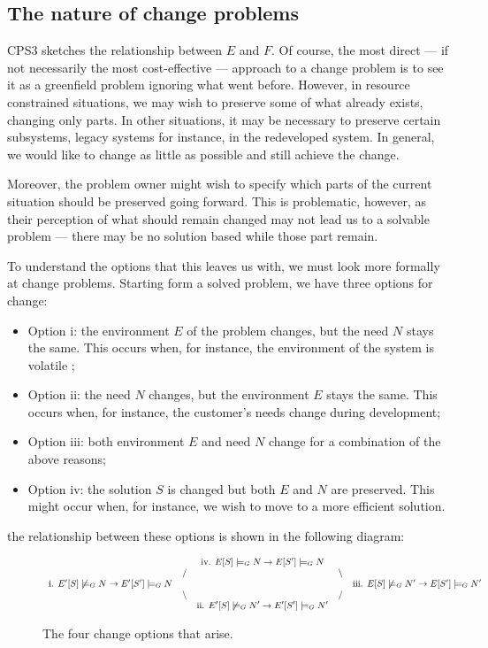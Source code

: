 \documentclass[runningheads,a4paper]{llncs}
\begin{document}
\subsection{The nature of change problems}

CPS3 sketches the relationship between $E$ and $F$. Of course, the most direct --- if not necessarily the most cost-effective --- approach to a change problem is to see it as a greenfield problem ignoring what went before. However, in resource constrained situations, we may wish to preserve some of what already exists, changing only parts. In other situations, it may be necessary to preserve certain subsystems, legacy systems for instance, in the redeveloped system. In general, we would like to change as little as possible and still achieve the change. 

Moreover, the problem owner might wish to specify which parts of the current situation should be preserved going forward. This is problematic, however, as their perception of what should remain changed may not lead us to a solvable problem --- there may be no solution based while those part remain.

To understand the options that this leaves us with, we must look more formally at change problems. Starting form a solved problem, we have three options for change:
%
\begin{itemize}
\item Option i: the environment $E$ of the problem changes, but the need $N$ stays the same. This occurs when, for instance, the environment of the system is volatile \cite{};
\item Option ii: the need $N$ changes, but the environment $E$ stays the same. This occurs when, for instance, the customer's needs change during development;
\item Option iii: both environment $E$ and need $N$ change for a combination of the above reasons;
\item Option iv: the solution $S$ is changed but both $E$ and $N$ are preserved. This might occur when, for instance, we wish to move to a more efficient solution.
\end{itemize}
%
the relationship between these options is shown in the following diagram:
%

\begin{figure}
\[\footnotesize\begin{array}{ccccc}
	&&\textrm{iv. }E[S]\models_G N\rightarrow E[S']\models_G N&&\\
	&\slash && \backslash&\\
\textrm{i. }E'[S]\not\models_G N\rightarrow E'[S']\models_G N&&&&\textrm{iii. }E[S]\not\models_G N'\rightarrow E[S']\models_G N'\\
	&\backslash && \slash&\\
&&\textrm{ii. }E'[S]\not\models_G N'\rightarrow E'[S']\models_G N'&&\\
\end{array}\]
\caption{The four change options that arise.}
\end{figure}
\end{document}
